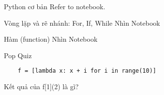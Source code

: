 \documentclass[10pt]{beamer}
\begin{document}
\begin{frame}[fragile]{Python cơ bản}
  Refer to notebook.
\end{frame}

\begin{frame}[fragile]{Vòng lặp và rẽ nhánh: For, If, While}
Nhìn Notebook
\end{frame}

\begin{frame}[fragile]{Hàm (function)}
Nhìn Notebook
\end{frame}

\begin{frame}[fragile]{Pop Quiz}
  \begin{verbatim}
    f = [lambda x: x + i for i in range(10)]
  \end{verbatim}
  Kết quả của f[1](2) là gì?
\end{frame}
%
%
%   
%   
%
\end{document}
